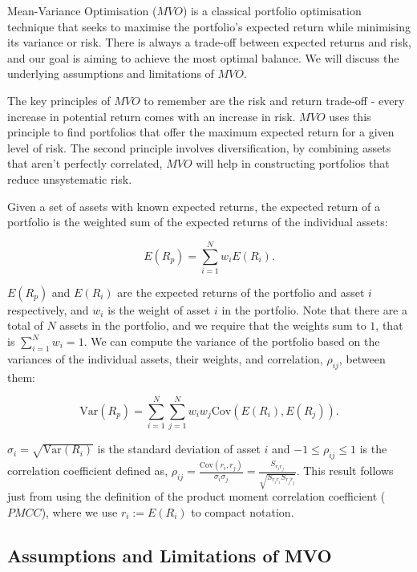 \documentclass[a4paper,12pt,titlepage]{article}
\numberwithin{equation}{section}
\begin{document}
Mean-Variance Optimisation ($MVO$) is a classical portfolio optimisation technique that seeks to maximise 
the portfolio's expected return while minimising its variance or risk. There is always a trade-off between 
expected returns and risk, and our goal is aiming to achieve the most optimal balance. We will discuss the 
underlying assumptions and limitations of $MVO$. \newline \par \noindent The key principles of $MVO$ to 
remember are the risk and return trade-off - every increase in potential return comes with an increase in risk. 
$MVO$ uses this principle to find portfolios that offer the maximum expected return for a given level of risk. 
The second principle involves diversification, by combining assets that aren't perfectly correlated, 
$MVO$ will help in constructing portfolios that reduce unsystematic risk.  \newline \par \noindent Given a set of 
assets with known expected returns, the expected return of a portfolio is the weighted sum of the expected returns 
of the individual assets:

$$ E(R_p) = \sum_{i=1}^{N} w_{i} E(R_{i}). $$

$E(R_{p})$ and $E(R_{i})$ are the expected returns of the portfolio and asset $i$ respectively, and $w_{i}$ is 
the weight of asset $i$ in the portfolio. Note that there are a total of $N$ assets in the portfolio,
and we require that the weights sum to $1$, that is $\sum_{i=1}^{N} w_{i} = 1$. We can compute the variance of the 
portfolio based on the variances of the individual assets, their weights, and correlation, $\rho_{ij}$, between them:

$$ \text{Var}(R_{p}) = \sum_{i=1}^{N} \sum_{j=1}^{N} w_{i} w_{j} \text{Cov}(E(R_{i}), E(R_{j})). $$

$ \sigma_{i} = \sqrt{\text{Var}(R_{i})} $ is the standard deviation of asset $i$ and 
$ -1 \leq \rho_{ij} \leq 1 $ is the correlation coefficient defined as, 
$ \rho_{ij} = \frac{\text{Cov}(r_{i}, r_{j})}{\sigma_{i} \sigma_{j}} = \frac{S_{r_{i}r_{j}}}{\sqrt{S_{r_{i}r_{i}} S_{r_{j}r_{j}}}}. $
This result follows just from using the definition of the product moment correlation coefficient ($PMCC$), where
we use $r_{i} := E(R_{i})$ to compact notation.

\subsection{Assumptions and Limitations of MVO}
\end{document}

